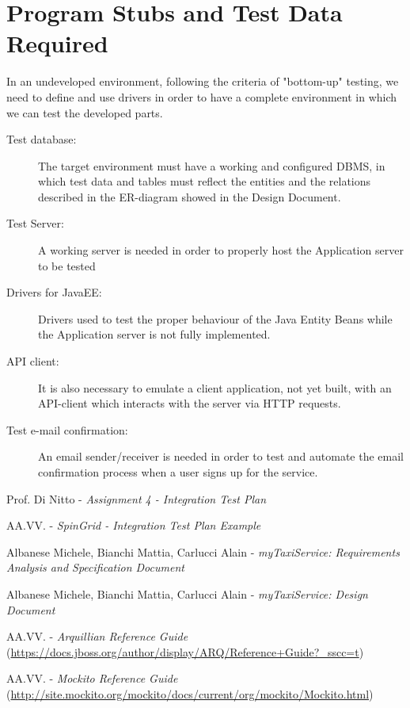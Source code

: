 \documentclass[a4paper, 12pt]{article}
\begin{document}
\newpage
\section{Program Stubs and Test Data Required}
\label{sub:program_stubs_and_test_data_required}
In an undeveloped environment, following the criteria of "bottom-up" testing, we need to define and use drivers in order to have a complete environment in which we can test the developed parts.

\begin{description}
    \item[Test database:] The target environment must have a working and configured DBMS, in which test data and tables must reflect the entities and the relations described in the ER-diagram showed in the Design Document.

    \item[Test Server:] A working server is needed in order to properly host the Application server to be tested

    \item[Drivers for JavaEE:] Drivers used to test the proper behaviour of the Java Entity Beans while the Application server is not fully implemented.

    \item[API client:] It is also necessary to emulate a client application, not yet built, with an API-client which interacts with the server via HTTP requests.

    \item[Test e-mail confirmation:] An email sender/receiver is needed in order to test and automate the email confirmation process when a user signs up for the service.
\end{description}

\appendix

\clearpage
{}

\begin{thebibliography}{9}
    Prof. Di Nitto - \emph{Assignment 4 - Integration Test Plan}

    AA.VV. - \emph{SpinGrid - Integration Test Plan Example}

        Albanese Michele, Bianchi Mattia, Carlucci Alain - \emph{myTaxiService: Requirements Analysis and Specification Document}

        Albanese Michele, Bianchi Mattia, Carlucci Alain - \emph{myTaxiService: Design Document}

        AA.VV. - \emph{Arquillian Reference Guide} {\small(\url{https://docs.jboss.org/author/display/ARQ/Reference+Guide?_sscc=t})}

        AA.VV. - \emph{Mockito Reference Guide} {\small(\url{http://site.mockito.org/mockito/docs/current/org/mockito/Mockito.html})}
\end{thebibliography}

\vfill

\end{document}

